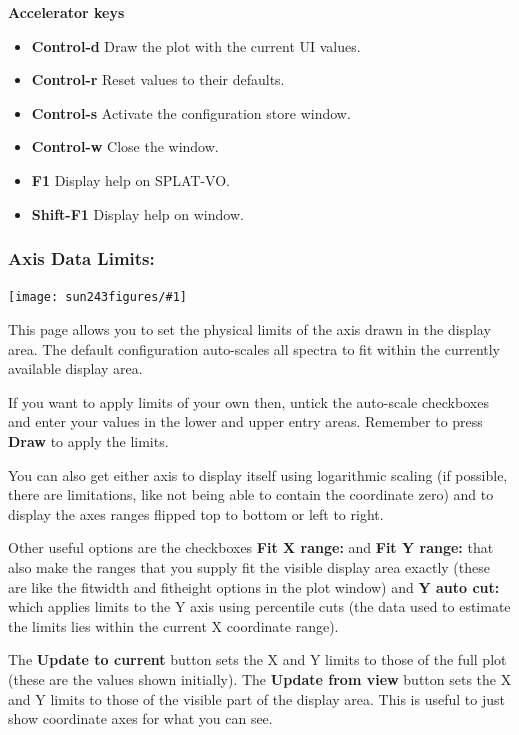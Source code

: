 \documentclass[twoside,11pt]{article}
\newcommand{\htmladdimg}[1]{}
\newcommand{\latexhtml}[2]{#1}
\renewcommand{\_}{\texttt{\symbol{95}}}
\newcommand{\SPLAT}{\textsf{SPLAT-VO}}
\newcommand{\mainfigure}[1]
{\begin{center}
 \latexhtml{\texttt{[image: sun243\_figures/\#1]}}{\htmladdimg{#1.gif}}
 \end{center}
}
\newcommand{\labelitem}[1]{\textbf{#1}}
\newcommand{\subheading}[1]{\textbf{\large{#1}}}
\begin{document}
\subheading{Accelerator keys}

\begin{itemize}
\item \labelitem{Control-d} Draw the plot with the current UI values.
\item \labelitem{Control-r} Reset values to their defaults.
\item \labelitem{Control-s} Activate the configuration store window.
\item \labelitem{Control-w} Close the window.
\item \labelitem{F1} Display help on \SPLAT.
\item \labelitem{Shift-F1} Display help on window.
\end{itemize}


\newpage
\subsubsection*{Axis Data Limits:}

\mainfigure{configurewindowlimits}

This page allows you to set the physical limits of the axis drawn in the
display area. The default configuration auto-scales all spectra to fit
within the currently available display area.

If you want to apply limits of your own then, untick the auto-scale checkboxes
and enter your values in the lower and upper entry areas. Remember to press
\labelitem{Draw} to apply the limits.

You can also get either axis to display itself using logarithmic scaling (if
possible, there are limitations, like not being able to contain the coordinate
zero) and to display the axes ranges flipped top to bottom or left to right.

Other useful options are the checkboxes \labelitem{Fit X range:} and
\labelitem{Fit Y range:} that also make the ranges that you supply
fit the visible display area exactly (these are like the fitwidth and
fitheight options in the plot window) and \labelitem{Y auto cut:} which
applies limits to the Y axis using percentile cuts (the data used to estimate
the limits lies within the current X coordinate range).

The \labelitem{Update to current} button sets the X and Y limits to
those of the full plot (these are the values shown initially).
The \labelitem{Update from view} button sets the X and Y limits to
those of the visible part of the display area. This is useful to just
show coordinate axes for what you can see.
\end{document}
